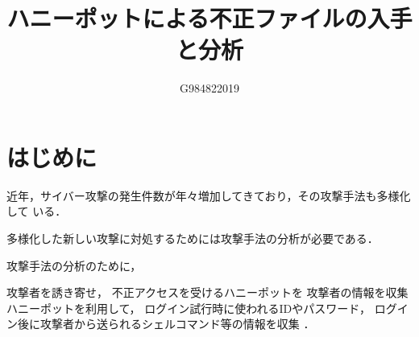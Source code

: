 \documentclass{entry}
\title{ハニーポットによる不正ファイルの入手と分析}
\author{G984822019}{吉村　直将}
\begin{document}
\maketitle

\section{はじめに}

近年，サイバー攻撃の発生件数が年々増加してきており，その攻撃手法も多様化して
いる．
\begin{Com}
多様化した新しい攻撃に対処するためには攻撃手法の分析が必要である．

攻撃手法の分析のために，
\end{Com}    
攻撃者を誘き寄せ，
不正アクセスを受けるハニーポットを
攻撃者の情報を収集
ハニーポットを利用して，
ログイン試行時に使われるIDやパスワード，
ログイン後に攻撃者から送られるシェルコマンド等の情報を収集
\cite{Entry}．




\end{document}
